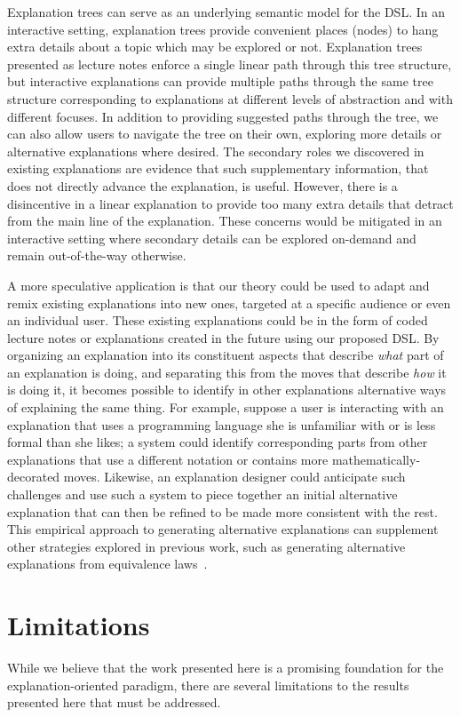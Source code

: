 \documentclass[sigconf]{acmart}
\begin{document}
Explanation trees can serve as an underlying semantic model for the DSL.
%
In an interactive setting, explanation trees provide convenient places (nodes)
to hang extra details about a topic which may be explored or not. Explanation
trees presented as lecture notes enforce a single linear path through this tree
structure, but interactive explanations can provide multiple paths through the
same tree structure corresponding to explanations at different levels of
abstraction and with different focuses. In addition to providing suggested
paths through the tree, we can also allow users to navigate the tree on their
own, exploring more details or alternative explanations where desired.
%
The secondary roles we discovered in existing explanations are evidence that
such supplementary information, that does not directly advance the explanation,
is useful. However, there is a disincentive in a linear explanation to provide
too many extra details that detract from the main line of the explanation.
These concerns would be mitigated in an interactive setting where secondary
details can be explored on-demand and remain out-of-the-way otherwise.


A more speculative application is that our theory could be used to adapt and
remix existing explanations into new ones, targeted at a specific audience or
even an individual user.
%
These existing explanations could be in the form of coded lecture notes or
explanations created in the future using our proposed DSL.
%
By organizing an explanation into its constituent aspects that describe
\emph{what} part of an explanation is doing, and separating this from the moves
that describe \emph{how} it is doing it, it becomes possible to identify in
other explanations alternative ways of explaining the same thing.
%
For example, suppose a user is interacting with an explanation that uses a
programming language she is unfamiliar with or is less formal than she likes; a
system could identify corresponding parts from other explanations that use a
different notation or contains more mathematically-decorated moves. Likewise,
an explanation designer could anticipate such challenges and use such a system
to piece together an initial alternative explanation that can then be refined
to be made more consistent with the rest.
%
This empirical approach to generating alternative explanations can supplement
other strategies explored in previous work, such as generating alternative
explanations from equivalence laws~\cite{EW13jvlc}.

\section{Limitations}
While we believe that the work presented here is a promising foundation for
the explanation-oriented paradigm, there are several limitations to the
results presented here that must be addressed.
\end{document}
